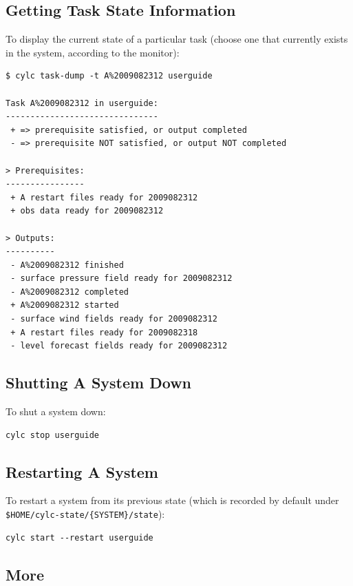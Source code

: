 \documentclass[11pt,a4paper]{article}
\begin{document}
\subsection{Getting Task State Information}
\label{QuickGettingTaskStateInformation}

To display the current state of a particular task (choose one that
currently exists in the system, according to the monitor):

\begin{lstlisting}
$ cylc task-dump -t A%2009082312 userguide

Task A%2009082312 in userguide:
-------------------------------
 + => prerequisite satisfied, or output completed
 - => prerequisite NOT satisfied, or output NOT completed

> Prerequisites:
----------------
 + A restart files ready for 2009082312
 + obs data ready for 2009082312

> Outputs:
----------
 - A%2009082312 finished
 - surface pressure field ready for 2009082312
 - A%2009082312 completed
 + A%2009082312 started
 - surface wind fields ready for 2009082312
 + A restart files ready for 2009082318
 - level forecast fields ready for 2009082312
\end{lstlisting}

\subsection{Shutting A System Down}
\label{QuickShuttingASystemDown}

To shut a system down:

\begin{lstlisting}
cylc stop userguide
\end{lstlisting}

\subsection{Restarting A System}
\label{QuickRestartingASystem}

To restart a system from its previous state (which is recorded by default 
under \lstinline=$HOME/cylc-state/{SYSTEM}/state=):

\begin{lstlisting}
cylc start --restart userguide
\end{lstlisting}

\subsection{More}
\end{document}
